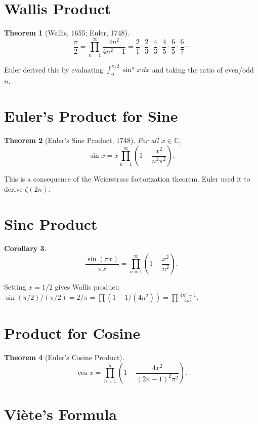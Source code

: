 \documentclass[11pt,a4paper,twoside]{book}
\theoremstyle{eulerstyle}
\newtheorem{theorem}{Theorem}[chapter]
\newtheorem{corollary}[theorem]{Corollary}
\theoremstyle{definition}
\newcommand{\C}{\mathbb{C}}
\begin{document}
\section{Wallis Product}

\begin{theorem}[Wallis, 1655; Euler, 1748]
\[
\frac{\pi}{2} = \prod_{n=1}^\infty \frac{4n^2}{4n^2 - 1}
= \frac{2}{1} \cdot \frac{2}{3} \cdot \frac{4}{3} \cdot \frac{4}{5} \cdot \frac{6}{5} \cdot \frac{6}{7} \cdots
\]
\end{theorem}

Euler derived this by evaluating $\int_0^{\pi/2} \sin^n x\, dx$ and taking the ratio of even/odd $n$.

\section{Euler's Product for Sine}

\begin{theorem}[Euler's Sine Product, 1748]
For all $x \in \C$,
\[
\sin x = x \prod_{n=1}^\infty \left(1 - \frac{x^2}{n^2 \pi^2}\right).
\]
\end{theorem}

This is a consequence of the Weierstrass factorization theorem. Euler used it to derive $\zeta(2n)$.

\section{Sinc Product}

\begin{corollary}
\[
\frac{\sin(\pi x)}{\pi x} = \prod_{n=1}^\infty \left(1 - \frac{x^2}{n^2}\right).
\]
\end{corollary}

Setting $x = 1/2$ gives Wallis product: $\sin(\pi/2)/(\pi/2) = 2/\pi = \prod (1 - 1/(4n^2)) = \prod \frac{4n^2-1}{4n^2}$.

\section{Product for Cosine}

\begin{theorem}[Euler's Cosine Product]
\[
\cos x = \prod_{n=1}^\infty \left(1 - \frac{4x^2}{(2n-1)^2 \pi^2}\right).
\]
\end{theorem}

\section{Viète's Formula}
\end{document}
